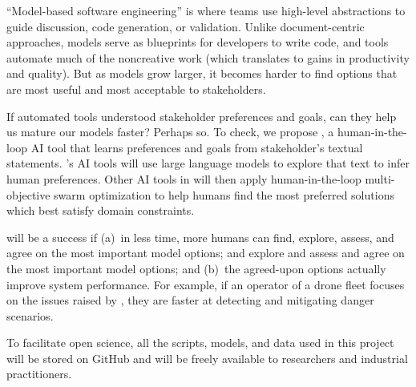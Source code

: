 
``Model-based software engineering'' is where teams use high-level abstractions to guide discussion, code generation, or validation. Unlike document-centric approaches, models serve as blueprints for developers to write code, and tools automate much of the noncreative work (which translates to gains in productivity and quality). But as models grow larger, it becomes harder to find options that are most useful and most acceptable to stakeholders.





 If automated tools understood stakeholder
preferences and goals, can they help us mature our models faster? Perhaps so. To check, we propose {\IT}, a  human-in-the-loop AI tool
that learns preferences and goals from stakeholder’s textual statements.  {\IT}'s AI tools will use large language models to explore that text to infer human preferences. Other AI tools in {\IT}  will then apply human-in-the-loop multi-objective swarm optimization to
help humans find the most preferred solutions which best satisfy domain constraints.

 {\IT}   will be a success if (a)~in less time, more humans can find, explore, assess, and agree on the most important model options; and  explore and  assess and agree on the most
important model options;  and
(b)~the agreed-upon options actually improve system performance. For example,
if an operator of a drone fleet focuses on the issues raised by \IT, they
are faster at detecting and mitigating danger scenarios.


To facilitate open science, all the scripts, models, and data used in this project will be stored on GitHub and will be freely available to researchers and industrial practitioners.

